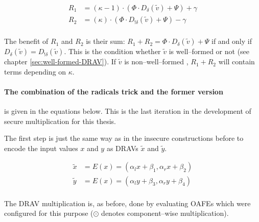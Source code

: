 \begin{align*}
  R_1 & = (\kappa -1)\cdot(\Phi \cdot D_\delta(\widetilde{v})+\Psi) + \gamma \\
  R_2 & = (\kappa)\cdot(\Phi \cdot D_{!\delta}(\widetilde{v})+\Psi) - \gamma \\
\end{align*}

\noindent{}The benefit of $R_1$ and $R_2$ is their sum: $R_1 + R_2 = \Phi \cdot
D_\delta(\widetilde{v}) + \Psi$ if and only if $D_\delta(\widetilde{v}) =
D_{!\delta}(\widetilde{v})$. This is the condition whether $\widetilde{v}$ is
well--formed or not (see chapter \ref{sec:well-formed-DRAV}).  If
$\widetilde{v}$ is non--well--formed , $R_1 + R_2$ will contain terms depending
on $\kappa$.

\paragraph{The combination of the radicals trick and the former version} is
given in the equations below. This is the last iteration in the development of
secure multiplication for this thesis.

The first step is just the same way as in the insecure constructions
before to encode the input values $x$ and $y$ as DRAVs $\widetilde{x}$ and
$\widetilde{y}$.

\begin{align*}
  \widetilde{x} & = E(x) = (\alpha_l x + \beta_1, \alpha_r x + \beta_2) \\
  \widetilde{y} & = E(x) = (\alpha_l y + \beta_3, \alpha_r y + \beta_4) \\
\end{align*}

\noindent{}The DRAV multiplication is, as before, done by evaluating OAFEs which
were configured for this purpose ($\odot$ denotes component--wise
multiplication).


